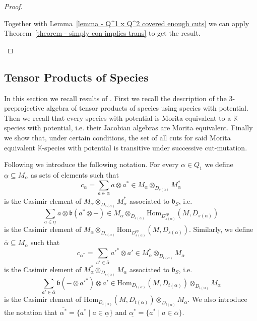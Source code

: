 \documentclass[a4paper, reqno]{amsart}
\theoremstyle{definition}
\newcommand{\K}{\mathbb{K}}
\renewcommand{\b}{\mathfrak{b}}
\begin{document}
\begin{proof}
\begin{enumerate}
		Together with Lemma~\ref{lemma - Q^1 x Q^2 covered enough cuts} we can apply Theorem~\ref{theorem - simply con implies trans} to get the result.
	\end{enumerate}
\end{proof}

\subsection{Tensor Products of Species}
In this section we recall results of \cite{soderberg2024mutation}. First we recall the description of the $3$-preprojective algebra of tensor products of species using species with potential. Then we recall that every species with potential is Morita equivalent to a $\K$-species with potential, i.e. their Jacobian algebras are Morita equivalent. Finally we show that, under certain conditions, the set of all cuts for said Morita equivalent $\K$-species with potential is transitive under successive cut-mutation.

Following \cite{soderberg2024mutation} we introduce the following notation. For every $\alpha\in Q_1$ we define $\underline{\alpha}\subseteq M_\alpha$ as sets of elements such that
\begin{equation*}
	c_\alpha = \sum_{a\in \underline{\alpha}} a \otimes a^* \in M_\alpha \otimes_{D_{s(\alpha)}} M_\alpha^*
\end{equation*}
is the Casimir element of $M_\alpha\otimes_{D_{s(\alpha)}}M_\alpha^*$ associated to $\b_S$, i.e.
\begin{equation*}
	\sum_{a\in \underline{\alpha}} a \otimes \b(a^*\otimes -)\in M_\alpha \otimes_{D_{s(\alpha)}} \mathrm{Hom}_{D_{s(\alpha)}^{op}}(M, D_{s(\alpha)})
\end{equation*}
is the Casimir element of $M_\alpha\otimes_{D_{s(\alpha)}} \mathrm{Hom}_{D_{s(\alpha)}^{op}}(M, D_{s(\alpha)})$. Similarly, we define $\overline{\alpha}\subseteq M_\alpha$ such that
\begin{equation*}
	c_{\alpha^*} = \sum_{a'\in \overline{\alpha}} {a'}^* \otimes a' \in M_\alpha^* \otimes_{D_{t(\alpha)}} M_\alpha
\end{equation*}
is the Casimir element of $M_\alpha^*\otimes_{D_{s(\alpha)}} M_\alpha$ associated to $\b_S$, i.e.
\begin{equation*}
	\sum_{a'\in \overline{\alpha}} \b(-\otimes {a'}^*)\otimes a'\in \mathrm{Hom}_{D_{t(\alpha)}}(M, D_{t(\alpha)}) \otimes_{D_{t(\alpha)}}  M_\alpha
\end{equation*}
is the Casimir element of $\mathrm{Hom}_{D_{t(\alpha)}}(M, D_{t(\alpha)}) \otimes_{D_{t(\alpha)}}  M_\alpha$. We also introduce the notation that $\overline{\alpha^*} = \{a^* \mid a\in \underline{\alpha} \}$ and $\underline{\alpha^*} = \{a^* \mid a\in \overline{\alpha} \}$.
\end{document}
